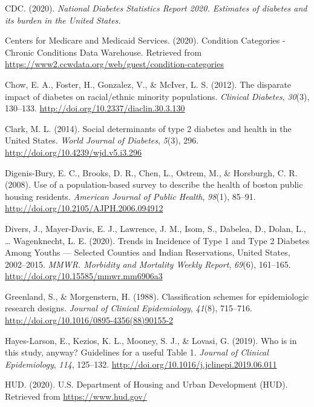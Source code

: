 \documentclass [11pt, proquest] {uwthesis}[2015/03/03]
\begin{document}
\hypertarget{ref-CDC2020}{}
CDC. (2020). \emph{National Diabetes Statistics Report 2020. Estimates
of diabetes and its burden in the United States.}

\hypertarget{ref-CMS2020}{}
Centers for Medicare and Medicaid Services. (2020). Condition Categories
- Chronic Conditions Data Warehouse. Retrieved from
\url{https://www2.ccwdata.org/web/guest/condition-categories}

\hypertarget{ref-Chow2012}{}
Chow, E. A., Foster, H., Gonzalez, V., \& McIver, L. S. (2012). The
disparate impact of diabetes on racial/ethnic minority populations.
\emph{Clinical Diabetes}, \emph{30}(3), 130--133.
\url{http://doi.org/10.2337/diaclin.30.3.130}

\hypertarget{ref-Clark2014}{}
Clark, M. L. (2014). Social determinants of type 2 diabetes and health
in the United States. \emph{World Journal of Diabetes}, \emph{5}(3),
296. \url{http://doi.org/10.4239/wjd.v5.i3.296}

\hypertarget{ref-Digenis-Bury2008}{}
Digenis-Bury, E. C., Brooks, D. R., Chen, L., Ostrem, M., \& Horsburgh,
C. R. (2008). Use of a population-based survey to describe the health of
boston public housing residents. \emph{American Journal of Public
Health}, \emph{98}(1), 85--91.
\url{http://doi.org/10.2105/AJPH.2006.094912}

\hypertarget{ref-Divers2020}{}
Divers, J., Mayer-Davis, E. J., Lawrence, J. M., Isom, S., Dabelea, D.,
Dolan, L., \ldots{} Wagenknecht, L. E. (2020). Trends in Incidence of
Type 1 and Type 2 Diabetes Among Youths --- Selected Counties and Indian
Reservations, United States, 2002--2015. \emph{MMWR. Morbidity and
Mortality Weekly Report}, \emph{69}(6), 161--165.
\url{http://doi.org/10.15585/mmwr.mm6906a3}

\hypertarget{ref-Greenland1988}{}
Greenland, S., \& Morgenstern, H. (1988). Classification schemes for
epidemiologic research designs. \emph{Journal of Clinical Epidemiology},
\emph{41}(8), 715--716.
\url{http://doi.org/10.1016/0895-4356(88)90155-2}

\hypertarget{ref-Hayes-Larson2019}{}
Hayes-Larson, E., Kezios, K. L., Mooney, S. J., \& Lovasi, G. (2019).
Who is in this study, anyway? Guidelines for a useful Table 1.
\emph{Journal of Clinical Epidemiology}, \emph{114}, 125--132.
\url{http://doi.org/10.1016/j.jclinepi.2019.06.011}

\hypertarget{ref-HUD2020}{}
HUD. (2020). U.S. Department of Housing and Urban Development (HUD).
Retrieved from \url{https://www.hud.gov/}
\end{document}
